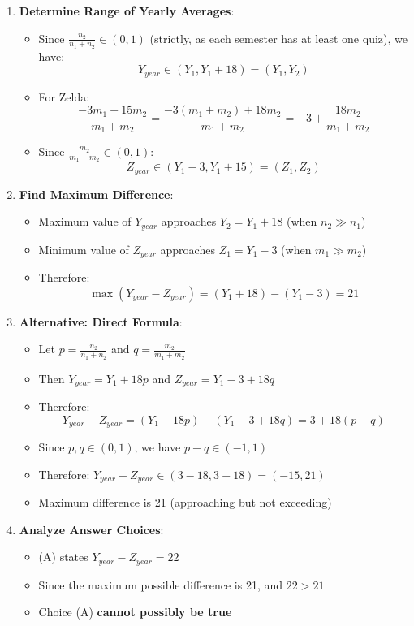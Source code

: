 \documentclass[12pt]{article}
\begin{document}
\begin{solutionbox}
\begin{enumerate}[leftmargin=*]
    \item \textbf{Determine Range of Yearly Averages}:
    \begin{itemize}
        \item Since $\frac{n_2}{n_1 + n_2} \in (0, 1)$ (strictly, as each semester has at least one quiz), we have:
        \[Y_{year} \in (Y_1, Y_1 + 18) = (Y_1, Y_2)\]
        \item For Zelda:
        \[\frac{-3m_1 + 15m_2}{m_1 + m_2} = \frac{-3(m_1 + m_2) + 18m_2}{m_1 + m_2} = -3 + \frac{18m_2}{m_1 + m_2}\]
        \item Since $\frac{m_2}{m_1 + m_2} \in (0, 1)$:
        \[Z_{year} \in (Y_1 - 3, Y_1 + 15) = (Z_1, Z_2)\]
    \end{itemize}
    
    \item \textbf{Find Maximum Difference}:
    \begin{itemize}
        \item Maximum value of $Y_{year}$ approaches $Y_2 = Y_1 + 18$ (when $n_2 \gg n_1$)
        \item Minimum value of $Z_{year}$ approaches $Z_1 = Y_1 - 3$ (when $m_1 \gg m_2$)
        \item Therefore:
        \[\max(Y_{year} - Z_{year}) = (Y_1 + 18) - (Y_1 - 3) = 21\]
    \end{itemize}
    
    \item \textbf{Alternative: Direct Formula}:
    \begin{itemize}
        \item Let $p = \frac{n_2}{n_1 + n_2}$ and $q = \frac{m_2}{m_1 + m_2}$
        \item Then $Y_{year} = Y_1 + 18p$ and $Z_{year} = Y_1 - 3 + 18q$
        \item Therefore:
        \[Y_{year} - Z_{year} = (Y_1 + 18p) - (Y_1 - 3 + 18q) = 3 + 18(p - q)\]
        \item Since $p, q \in (0, 1)$, we have $p - q \in (-1, 1)$
        \item Therefore: $Y_{year} - Z_{year} \in (3 - 18, 3 + 18) = (-15, 21)$
        \item Maximum difference is 21 (approaching but not exceeding)
    \end{itemize}
    
    \item \textbf{Analyze Answer Choices}:
    \begin{itemize}
        \item (A) states $Y_{year} - Z_{year} = 22$
        \item Since the maximum possible difference is 21, and $22 > 21$
        \item Choice (A) \textbf{cannot possibly be true}
    \end{itemize}
    

\end{enumerate}
\end{solutionbox}
\end{document}

